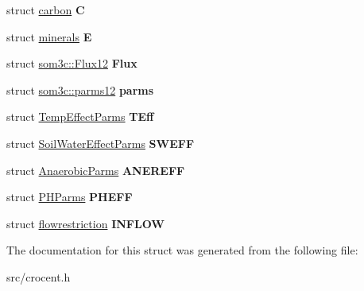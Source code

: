 \begin{DoxyCompactItemize}
\item 
\hypertarget{structsom3c_a193d6f62a24d1f3a995545a533806f96}{struct \hyperlink{structcarbon}{carbon} {\bfseries C}}\label{structsom3c_a193d6f62a24d1f3a995545a533806f96}

\item 
\hypertarget{structsom3c_a864ea728160cb1ea2770b1edef899008}{struct \hyperlink{structminerals}{minerals} {\bfseries E}}\label{structsom3c_a864ea728160cb1ea2770b1edef899008}

\item 
\hypertarget{structsom3c_aa5e777f61e0412679ec25f0885663b67}{struct \hyperlink{structsom3c_1_1_flux12}{som3c\-::\-Flux12} {\bfseries Flux}}\label{structsom3c_aa5e777f61e0412679ec25f0885663b67}

\item 
\hypertarget{structsom3c_a1b491c57d4ef202bdd910be358cdf232}{struct \hyperlink{structsom3c_1_1parms12}{som3c\-::parms12} {\bfseries parms}}\label{structsom3c_a1b491c57d4ef202bdd910be358cdf232}

\item 
\hypertarget{structsom3c_aad16e44ea073f033cc057621a86e50b9}{struct \hyperlink{struct_temp_effect_parms}{Temp\-Effect\-Parms} {\bfseries T\-Eff}}\label{structsom3c_aad16e44ea073f033cc057621a86e50b9}

\item 
\hypertarget{structsom3c_a6820b1139aacff5dfabec09070b52ced}{struct \hyperlink{struct_soil_water_effect_parms}{Soil\-Water\-Effect\-Parms} {\bfseries S\-W\-E\-F\-F}}\label{structsom3c_a6820b1139aacff5dfabec09070b52ced}

\item 
\hypertarget{structsom3c_a54824d3a26b69466b6da275a0faff950}{struct \hyperlink{struct_anaerobic_parms}{Anaerobic\-Parms} {\bfseries A\-N\-E\-R\-E\-F\-F}}\label{structsom3c_a54824d3a26b69466b6da275a0faff950}

\item 
\hypertarget{structsom3c_a8c55c6cb5e2d3c1f4da58529a21d2bdc}{struct \hyperlink{struct_p_h_parms}{P\-H\-Parms} {\bfseries P\-H\-E\-F\-F}}\label{structsom3c_a8c55c6cb5e2d3c1f4da58529a21d2bdc}

\item 
\hypertarget{structsom3c_a2fa3a4454976aeed04276bc024d6884b}{struct \hyperlink{structflowrestriction}{flowrestriction} {\bfseries I\-N\-F\-L\-O\-W}}\label{structsom3c_a2fa3a4454976aeed04276bc024d6884b}

\end{DoxyCompactItemize}


The documentation for this struct was generated from the following file\-:\begin{DoxyCompactItemize}
\item 
src/crocent.\-h\end{DoxyCompactItemize}
